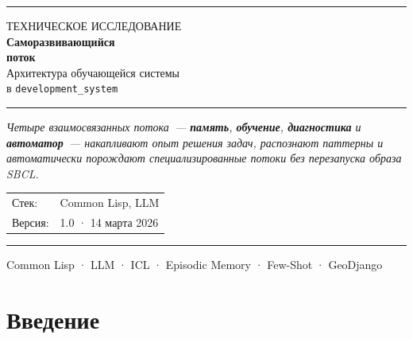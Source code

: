 \documentclass[10pt, oneside]{article}
\begin{document}
\thispagestyle{empty}
\vspace*{8mm}

{\color{AccentBlue}\rule{\linewidth}{1.2pt}}
\vspace{3mm}

{\sffamily\fontsize{7}{9}\color{MidGray} ТЕХНИЧЕСКОЕ ИССЛЕДОВАНИЕ}\\[3mm]

{\sffamily\fontsize{12}{15}\bfseries\color{AccentBlue}
  Саморазвивающийся\\поток
}\\[2mm]

{\sffamily\fontsize{8}{10}\color{DarkGray}
  Архитектура обучающейся системы\\
  в \texttt{development\_system}
}

\vspace{4mm}
{\color{AccentBlue}\rule{\linewidth}{0.4pt}}
\vspace{4mm}

{\fontsize{7.5}{10}\itshape\color{DarkGray}
  Четыре взаимосвязанных потока~--- \textbf{память},
  \textbf{обучение}, \textbf{диагностика} и \textbf{автоматор}~---
  накапливают опыт решения задач, распознают паттерны
  и автоматически порождают специализированные потоки
  без перезапуска образа SBCL.
}

\vfill

\begin{tabular}{@{}ll@{}}
  {\fontsize{7}{8}\color{MidGray}Стек:}    & {\fontsize{7}{8} Common Lisp, LLM} \\[1pt]
  {\fontsize{7}{8}\color{MidGray}Версия:}  & {\fontsize{7}{8} 1.0 · 14 марта 2026} \\
\end{tabular}

\vspace{4mm}
{\color{AccentBlue}\rule{\linewidth}{0.4pt}}

{\fontsize{6.5}{8}\color{MidGray}
  Common Lisp · LLM · ICL · Episodic Memory · Few-Shot · GeoDjango
}

\newpage

{\fontsize{8}{10}\tableofcontents}
\newpage

\section{Введение}
\end{document}
